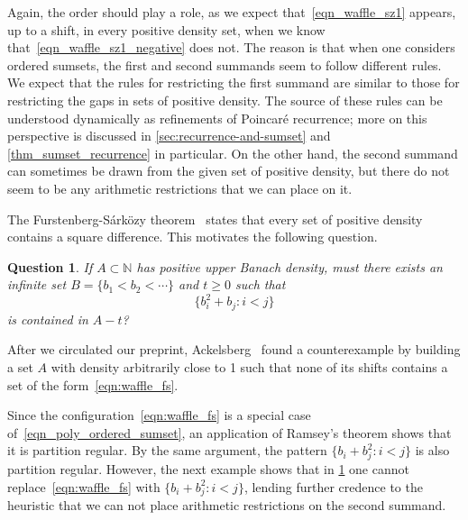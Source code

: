 \documentclass[10pt,dvipsnames]{article}
\newtheorem{question}[theorem]{Question}
\theoremstyle{definition}
\theoremstyle{plain}
\newcommand{\N}{\mathbb{N}}
\newcommand{\Poincare}{Poincar\'{e}}
\newcommand{\Sarkozy}{S\'{a}rk\"{o}zy}
\begin{document}
Again, the order should play a role, as 
 we expect that~\eqref{eqn_waffle_sz1} appears, up to a shift, in every positive density set, when we know that~\eqref{eqn_waffle_sz1_negative} does not.
The reason is that when one considers ordered sumsets, the  first and second summands seem to follow different rules. 
We expect that the rules for restricting the first summand are similar to those for restricting the gaps in sets of positive density.
The source of these rules can be understood dynamically as refinements of \Poincare{} recurrence;  more on this perspective is discussed in  \cref{sec:recurrence-and-sumset} and \cref{thm_sumset_recurrence} in particular.
On the other hand, the second summand can sometimes be drawn from the given set of positive density, but  
there do not seem to be any arithmetic restrictions that we can place on it.

The Furstenberg-\Sarkozy{} theorem~\cite{Furstenberg-1977,sarkozy78} states that every set of positive density contains a square difference.
This motivates the following question.



\begin{question}
\label{q_sumset_sarkozy}
If $A\subset\N$ has positive upper Banach density, must there exists an infinite set $B=\{b_1< b_2<\cdots\}$ and $t\geq 0$ such that 
\begin{equation}
\label{eqn:waffle_fs}
\{b_i^2+b_j: i<j\}
\end{equation}
is contained in $A-t$?
\end{question}

After we circulated our preprint, Ackelsberg~\cite{ackelsberg} found a counterexample by building a set $A$ with density arbitrarily close to 1 such that none of its shifts contains a set of the form~\eqref{eqn:waffle_fs}.  


Since the configuration~\eqref{eqn:waffle_fs} is a special case of~\eqref{eqn_poly_ordered_sumset}, an application of Ramsey's theorem shows that it is partition regular.
By the same argument, the pattern $\{b_i + b_j^2 : i<j\}$ is also partition regular.
However, the next example shows that in \cref{q_sumset_sarkozy} one cannot replace~\eqref{eqn:waffle_fs} with $\{b_i+b_j^2: i<j\}$, lending  further credence to the heuristic that we can not place arithmetic restrictions on the second summand. 
\end{document}
